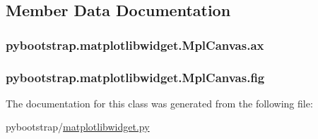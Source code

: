 \subsection{Member Data Documentation}
\hypertarget{classpybootstrap_1_1matplotlibwidget_1_1MplCanvas_aa45913fda725c77291ea6bac361dc2f4}{
\subsubsection[{ax}]{\setlength{\rightskip}{0pt plus 5cm}pybootstrap.\-matplotlibwidget.\-Mpl\-Canvas.\-ax}}\label{classpybootstrap_1_1matplotlibwidget_1_1MplCanvas_aa45913fda725c77291ea6bac361dc2f4}
\hypertarget{classpybootstrap_1_1matplotlibwidget_1_1MplCanvas_afd78bff7414f84f529c5f11c9d26921e}{
\subsubsection[{fig}]{\setlength{\rightskip}{0pt plus 5cm}pybootstrap.\-matplotlibwidget.\-Mpl\-Canvas.\-fig}}\label{classpybootstrap_1_1matplotlibwidget_1_1MplCanvas_afd78bff7414f84f529c5f11c9d26921e}


The documentation for this class was generated from the following file\-:\begin{DoxyCompactItemize}
\item 
pybootstrap/\hyperlink{matplotlibwidget_8py}{matplotlibwidget.\-py}\end{DoxyCompactItemize}
